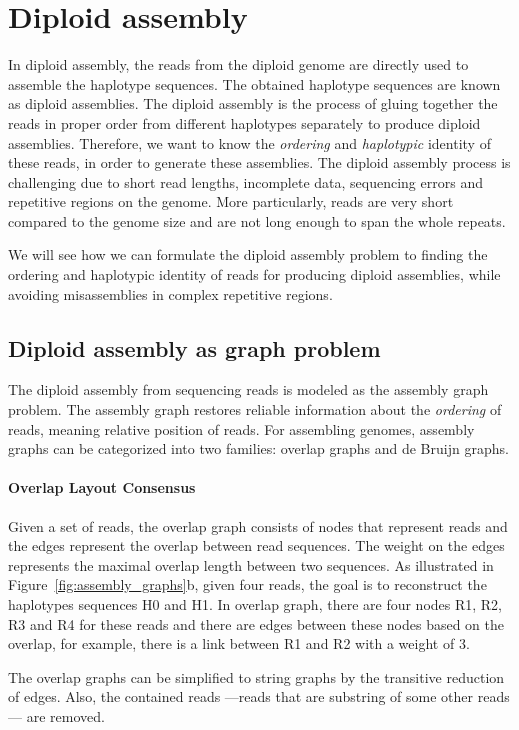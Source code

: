 \section{Diploid assembly}\label{sec:dip}
In diploid assembly, the reads from the diploid genome are directly used to assemble the haplotype sequences. The obtained haplotype sequences are known as diploid assemblies.
The diploid assembly is the process of gluing together the reads in proper order from different haplotypes separately to produce diploid assemblies.
Therefore, we want to know the \textit{ordering} and \textit{haplotypic} identity of these reads, in order to generate these assemblies. 
The diploid assembly process is challenging due to short read lengths, incomplete data, sequencing errors and repetitive regions on the genome.
More particularly, reads are very short compared to the genome size and are not long enough to span the whole repeats.

We will see how we can formulate the diploid assembly problem to finding the ordering and haplotypic identity of reads for producing diploid assemblies, while avoiding misassemblies in complex repetitive regions.

\subsection{Diploid assembly as graph problem}
The diploid assembly from sequencing reads is modeled as the assembly graph problem.
The assembly graph restores reliable information about the \textit{ordering} of reads, meaning relative position of reads.
For assembling genomes, assembly graphs can be categorized into two families: overlap graphs and de Bruijn graphs.
\paragraph{Overlap Layout Consensus}
Given a set of reads, the overlap graph consists of nodes that represent reads and the edges represent the overlap between read sequences.
The weight on the edges represents the maximal overlap length between two sequences. As illustrated in Figure~\ref{fig:assembly_graphs}b, 
given four reads, the goal is to reconstruct the haplotypes sequences H0 and H1.
In overlap graph, there are four nodes R1, R2, R3 and R4 for these reads and there are edges between these nodes based on the overlap, for example, there is a link between R1 and R2 with a weight of 3.

The overlap graphs can be simplified to string graphs by the transitive reduction of edges.
Also, the contained reads ---reads that are substring of some
other reads --- are removed.

